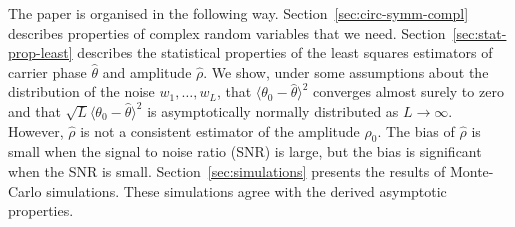 \documentclass{article}
\begin{document}
The paper is organised in the following way.  Section~\ref{sec:circ-symm-compl} describes properties of complex random variables that we need.  Section~\ref{sec:stat-prop-least} describes the statistical properties of the least squares estimators of carrier phase $\hat{\theta}$ and amplitude $\hat{\rho}$.  We show, under some assumptions about the distribution of the noise $w_1,\dots,w_L$, that $\langle\theta_0 - \hat{\theta}\rangle^2$ converges almost surely to zero and that $\sqrt{L}\langle\theta_0 - \hat{\theta}\rangle^2$ is asymptotically normally distributed as $L\rightarrow \infty$.  However, $\hat{\rho}$ is not a consistent estimator of the amplitude $\rho_0$.  The bias of $\hat{\rho}$ is small when the signal to noise ratio (SNR) is large, but the bias is significant when the SNR is small.  %
Section~\ref{sec:simulations} presents the results of Monte-Carlo simulations.  These simulations agree with the derived asymptotic properties. 




\end{document}
